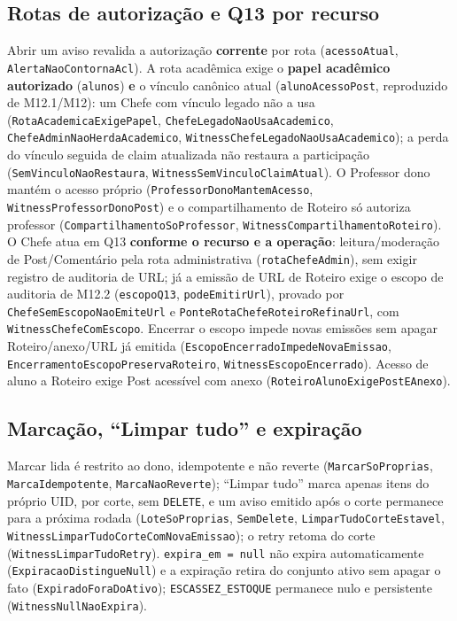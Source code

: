 \subsection*{Rotas de autorização e Q13 por recurso}
Abrir um aviso revalida a autorização \textbf{corrente} por rota
(\texttt{acessoAtual}, \texttt{AlertaNaoContornaAcl}). A rota acadêmica exige o
\textbf{papel acadêmico autorizado} (\texttt{alunos}) \textbf{e} o vínculo
canônico atual (\texttt{alunoAcessoPost}, reproduzido de M12.1/M12): um Chefe
com vínculo legado não a usa (\texttt{RotaAcademicaExigePapel},
\texttt{ChefeLegadoNaoUsaAcademico}, \texttt{ChefeAdminNaoHerdaAcademico},
\texttt{WitnessChefeLegadoNaoUsaAcademico}); a perda do vínculo seguida de claim
atualizada não restaura a participação (\texttt{SemVinculoNaoRestaura},
\texttt{WitnessSemVinculoClaimAtual}). O Professor dono mantém o acesso próprio
(\texttt{ProfessorDonoMantemAcesso}, \texttt{WitnessProfessorDonoPost}) e o
compartilhamento de Roteiro só autoriza professor
(\texttt{CompartilhamentoSoProfessor}, \texttt{WitnessCompartilhamentoRoteiro}).
O Chefe atua em Q13 \textbf{conforme o recurso e a operação}: leitura/moderação
de Post/Comentário pela rota administrativa (\texttt{rotaChefeAdmin}), sem
exigir registro de auditoria de URL; já a emissão de URL de Roteiro exige o
escopo de auditoria de M12.2 (\texttt{escopoQ13}, \texttt{podeEmitirUrl}),
provado por \texttt{ChefeSemEscopoNaoEmiteUrl} e
\texttt{PonteRotaChefeRoteiroRefinaUrl}, com
\texttt{WitnessChefeComEscopo}. Encerrar o escopo impede novas emissões sem
apagar Roteiro/anexo/URL já emitida
(\texttt{EscopoEncerradoImpedeNovaEmissao},
\texttt{EncerramentoEscopoPreservaRoteiro}, \texttt{WitnessEscopoEncerrado}).
Acesso de aluno a Roteiro exige Post acessível com anexo
(\texttt{RoteiroAlunoExigePostEAnexo}).

\subsection*{Marcação, ``Limpar tudo'' e expiração}
Marcar lida é restrito ao dono, idempotente e não reverte
(\texttt{MarcarSoProprias}, \texttt{MarcaIdempotente}, \texttt{MarcaNaoReverte});
``Limpar tudo'' marca apenas itens do próprio UID, por corte, sem
\texttt{DELETE}, e um aviso emitido após o corte permanece para a próxima rodada
(\texttt{LoteSoProprias}, \texttt{SemDelete}, \texttt{LimparTudoCorteEstavel},
\texttt{WitnessLimparTudoCorteComNovaEmissao}); o retry retoma do corte
(\texttt{WitnessLimparTudoRetry}). \texttt{expira\_em = null} não expira
automaticamente (\texttt{ExpiracaoDistingueNull}) e a expiração retira do
conjunto ativo sem apagar o fato (\texttt{ExpiradoForaDoAtivo});
\texttt{ESCASSEZ\_ESTOQUE} permanece nulo e persistente
(\texttt{WitnessNullNaoExpira}).

